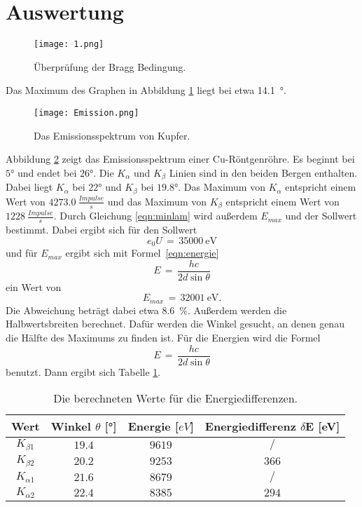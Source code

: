 \documentclass[
  bibliography=totoc,     %
  captions=tableheading,  %
  titlepage=firstiscover, %
]{scrartcl}
\begin{document}
\section{Auswertung}
\label{sec:auswertung}
\begin{figure}[H]
  \centering
  \texttt{[image: 1.png]}
  \caption{Überprüfung der Bragg Bedingung.}
  \label{fig:6025}
\end{figure}
Das Maximum des Graphen in Abbildung \ref{fig:6025} liegt bei etwa \SI{14.1}{°}.
\begin{figure}[H]
  \centering
  \texttt{[image: Emission.png]}
  \caption{Das Emissionsspektrum von Kupfer.}
  \label{fig:60211}
\end{figure}
\noindent
Abbildung \ref{fig:60211} zeigt das Emissionsspektrum einer Cu-Röntgenröhre. Es beginnt bei $5°$ und endet bei $26°$. Die $K_{\alpha}$ und $K_{\beta}$ Linien sind in den beiden Bergen enthalten. Dabei liegt $K_{\alpha}$ bei $22°$ und $K_{\beta}$ bei $19.8°$. Das Maximum von $K_{\alpha}$ entspricht einem Wert von $\SI{4273,0}{\frac{Impulse}{s}}$ und das Maximum von $K_{\beta}$ entspricht
einem Wert von $\SI{1228}{\frac{Impulse}{s}}$. Durch Gleichung \eqref{eqn:minlam} wird außerdem $E_{max}$ und der Sollwert bestimmt. Dabei ergibt sich für den Sollwert
\begin{equation*}
  e_0 U\,=\,\SI{35000}{\electronvolt}
\end{equation*}
und für $E_{max}$ ergibt sich mit Formel~\eqref{eqn:energie}
\begin{equation}
  E\,=\,\frac{hc}{2d\sin\theta}
  \label{eqn:energie}
\end{equation}
ein Wert von
\begin{equation*}
  E_{max}\,=\,\SI{32001}{\electronvolt}.
\end{equation*}
Die Abweichung beträgt dabei etwa \SI{8.6}{\percent}. Außerdem werden die Halbwertsbreiten berechnet. Dafür werden die Winkel gesucht, an denen genau die Hälfte des Maximums zu finden ist. Für die Energien wird die Formel
\begin{equation}
  E\,=\,\frac{hc}{2d\sin\theta}
\end{equation}
benutzt. Dann ergibt sich Tabelle \ref{tab:energiedifferenzen}.
\begin{table}[H]
	\begin{center}
	\caption{Die berechneten Werte für die Energiedifferenzen.}
	\label{tab:energiedifferenzen}
		\begin{tabular}{cccc}
			\toprule
			{Wert} & {Winkel $\theta$ [°]} & {Energie [$eV$]}
      & {Energiedifferenz $\delta$E [eV]}\\
			\midrule
      $K_{\beta 1}$ & $19.4$ & $9619$ & $/$ \\
			$K_{\beta 2}$ & $20.2$ & $9253$ & $366$ \\
			$K_{\alpha 1}$ & $21.6$ & $8679$ & $/$\\
			$K_{\alpha 2}$ & $22.4$ & $8385$ & $294$ \\
			\bottomrule
		\end{tabular}
	\end{center}
\end{table}
\end{document}
